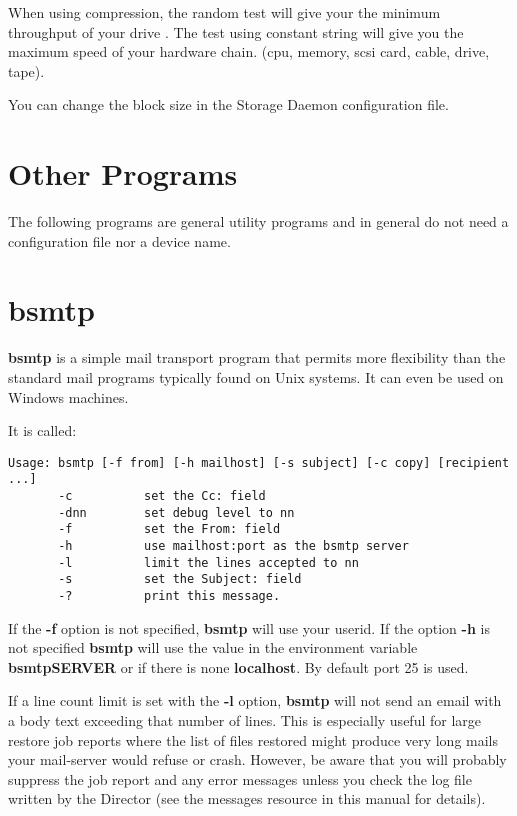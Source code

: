 When using compression, the random test will give your the minimum throughput
of your drive . The test using constant string will give you the maximum speed
of your hardware chain. (cpu, memory, scsi card, cable, drive, tape).

You can change the block size in the Storage Daemon configuration file.

\section{Other Programs}

The following programs are general utility programs and in general do not need
a configuration file nor a device name. 

\section{bsmtp}
\label{bsmtp}

{\bf bsmtp} is a simple mail transport program that permits more flexibility
than the standard mail programs typically found on Unix systems. It can even
be used on Windows machines. 

It is called: 

\footnotesize
\begin{verbatim}
Usage: bsmtp [-f from] [-h mailhost] [-s subject] [-c copy] [recipient ...]
       -c          set the Cc: field
       -dnn        set debug level to nn
       -f          set the From: field
       -h          use mailhost:port as the bsmtp server
       -l          limit the lines accepted to nn
       -s          set the Subject: field
       -?          print this message.
\end{verbatim}
\normalsize

If the {\bf -f} option is not specified, {\bf bsmtp} will use your userid. If
the option {\bf -h} is not specified {\bf bsmtp} will use the value in the environment
variable {\bf bsmtpSERVER} or if there is none {\bf localhost}. By default
port 25 is used. 

If a line count limit is set with the {\bf -l} option, {\bf bsmtp} will
not send an email with a body text exceeding that number of lines. This
is especially useful for large restore job reports where the list of
files restored might produce very long mails your mail-server would
refuse or crash. However, be aware that you will probably suppress the
job report and any error messages unless you check the log file written
by the Director (see the messages resource in this manual for details).


